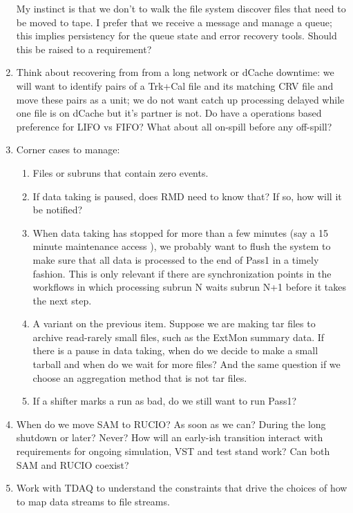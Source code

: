 \begin{enumerate}
    My instinct is that we don't to walk the file system discover files that need to be moved to tape.
    I prefer that we receive a message and manage a queue; this implies persistency for the queue state
    and error recovery tools.
    Should this be raised to a requirement?
  \item Think about recovering from from a long network or dCache downtime:
    we will want to identify pairs of a Trk+Cal file and its matching CRV file and move these pairs as a unit;
    we do not want catch up processing delayed while one file is on dCache but it's partner is not.
    Do have a operations based preference for LIFO vs FIFO? What about all on-spill before any off-spill?
  \item Corner cases to manage:
    \begin{enumerate}
      \item Files or subruns that contain zero events.
      \item If data taking is paused, does RMD need to know that?  If so, how will it be notified?
      \item When data taking has stopped for more than a few minutes (say a 15 minute maintenance access ),
        we probably want to flush the system to make sure that all data is processed to the end of Pass1
        in a timely fashion.
        This is only relevant if there are synchronization points in the workflows in which processing
        subrun N waits subrun N+1 before it takes the next step.
      \item A variant on the previous item.  Suppose we are making tar files to archive read-rarely small
        files, such as the ExtMon summary data.
        If there is a pause in data taking, when do we decide to make a small tarball and when
        do we wait for more files?  And the same question if we choose an aggregation method that is not
        tar files.
      \item If a shifter marks a run as bad, do we still want to run Pass1?
    \end{enumerate}
  \item   When do we move SAM to RUCIO? As soon as we can? During the long shutdown or later?  Never?
    How will an early-ish transition interact with requirements for ongoing simulation, VST and test stand work?
    Can both SAM and RUCIO coexist?
  \item Work with TDAQ to understand the constraints that drive the choices of how to
    map data streams to file streams.
    \begin{enumerate}

\end{enumerate}
\end{enumerate}
